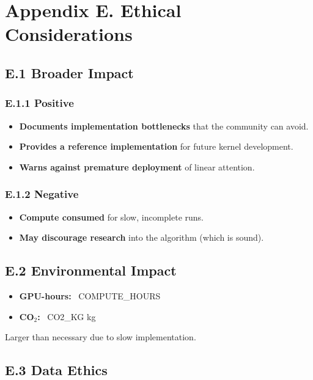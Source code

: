 
\section{Appendix E. Ethical Considerations}

\subsection{E.1 Broader Impact}

\subsubsection{E.1.1 Positive}

\begin{itemize}
\item \textbf{Documents implementation bottlenecks} that the community can avoid.
\item \textbf{Provides a reference implementation} for future kernel development.
\item \textbf{Warns against premature deployment} of linear attention.

\end{itemize}
\subsubsection{E.1.2 Negative}

\begin{itemize}
\item \textbf{Compute consumed} for slow, incomplete runs.
\item \textbf{May discourage research} into the algorithm (which is sound).

\end{itemize}
\subsection{E.2 Environmental Impact}

\begin{itemize}
\item \textbf{GPU-hours:} ~{{COMPUTE\_HOURS}}
\item \textbf{CO$_2$:} ~{{CO2\_KG}} kg

\end{itemize}
Larger than necessary due to slow implementation.

\subsection{E.3 Data Ethics}

